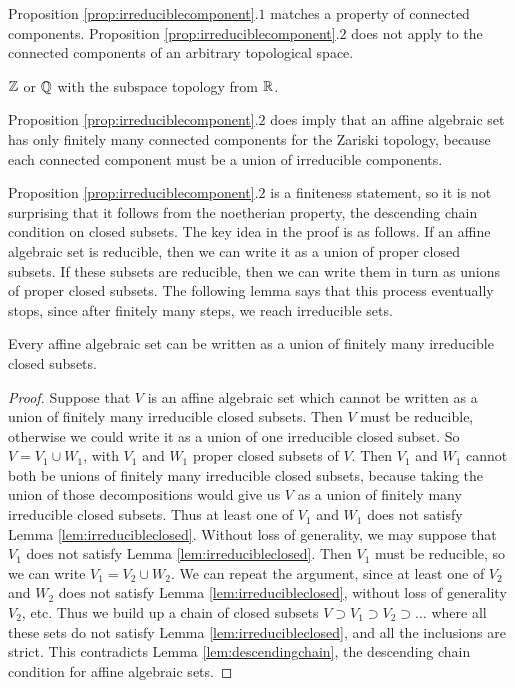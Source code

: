 Proposition \ref{prop:irreduciblecomponent}.$ 1 $ matches a property of connected components. Proposition \ref{prop:irreduciblecomponent}.$ 2 $ does not apply to the connected components of an arbitrary topological space.

\begin{example*}
$ \mathbb{Z} $ or $ \mathbb{Q} $ with the subspace topology from $ \mathbb{R} $.
\end{example*}

\begin{note*}
Proposition \ref{prop:irreduciblecomponent}.$ 2 $ does imply that an affine algebraic set has only finitely many connected components for the Zariski topology, because each connected component must be a union of irreducible components.
\end{note*}

Proposition \ref{prop:irreduciblecomponent}.$ 2 $ is a finiteness statement, so it is not surprising that it follows from the noetherian property, the descending chain condition on closed subsets. The key idea in the proof is as follows. If an affine algebraic set is reducible, then we can write it as a union of proper closed subsets. If these subsets are reducible, then we can write them in turn as unions of proper closed subsets. The following lemma says that this process eventually stops, since after finitely many steps, we reach irreducible sets.

\begin{lemma}
\label{lem:irreducibleclosed}
Every affine algebraic set can be written as a union of finitely many irreducible closed subsets.
\end{lemma}

\begin{proof}
Suppose that $ V $ is an affine algebraic set which cannot be written as a union of finitely many irreducible closed subsets. Then $ V $ must be reducible, otherwise we could write it as a union of one irreducible closed subset. So $ V = V_1 \cup W_1 $, with $ V_1 $ and $ W_1 $ proper closed subsets of $ V $. Then $ V_1 $ and $ W_1 $ cannot both be unions of finitely many irreducible closed subsets, because taking the union of those decompositions would give us $ V $ as a union of finitely many irreducible closed subsets. Thus at least one of $ V_1 $ and $ W_1 $ does not satisfy Lemma \ref{lem:irreducibleclosed}. Without loss of generality, we may suppose that $ V_1 $ does not satisfy Lemma \ref{lem:irreducibleclosed}. Then $ V_1 $ must be reducible, so we can write $ V_1 = V_2 \cup W_2 $. We can repeat the argument, since at least one of $ V_2 $ and $ W_2 $ does not satisfy Lemma \ref{lem:irreducibleclosed}, without loss of generality $ V_2 $, etc. Thus we build up a chain of closed subsets $ V \supset V_1 \supset V_2 \supset \dots $ where all these sets do not satisfy Lemma \ref{lem:irreducibleclosed}, and all the inclusions are strict. This contradicts Lemma \ref{lem:descendingchain}, the descending chain condition for affine algebraic sets.
\end{proof}

